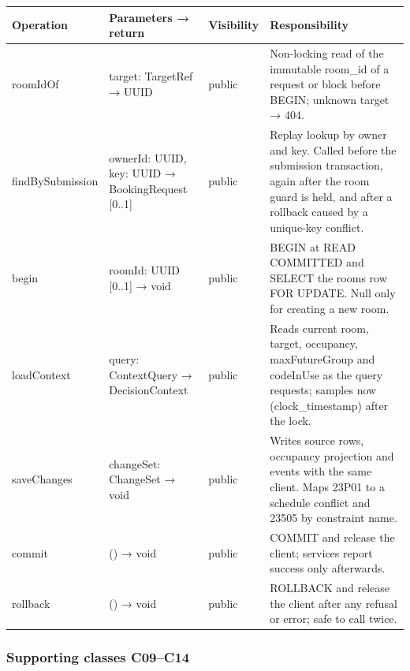 \small
\setlength{\tabcolsep}{3pt}
\renewcommand{\arraystretch}{1.12}
\begin{longtable}{|p{}|p{}|p{}|p{}|}
\hline
\textbf{Operation} & \textbf{Parameters → return} & \textbf{Visibility} & \textbf{Responsibility} \\ \hline
\endfirsthead \hline
roomIdOf & target: TargetRef → UUID & public & Non-locking read of the immutable room\_id of a request or block before BEGIN; unknown target → 404. \\ \hline
findBySubmission & ownerId: UUID, key: UUID → BookingRequest [0..1] & public & Replay lookup by owner and key. Called before the submission transaction, again after the room guard is held, and after a rollback caused by a unique-key conflict. \\ \hline
begin & roomId: UUID [0..1] → void & public & BEGIN at READ COMMITTED and SELECT the rooms row FOR UPDATE. Null only for creating a new room. \\ \hline
loadContext & query: ContextQuery → DecisionContext & public & Reads current room, target, occupancy, maxFutureGroup and codeInUse as the query requests; samples now (clock\_timestamp) after the lock. \\ \hline
saveChanges & changeSet: ChangeSet → void & public & Writes source rows, occupancy projection and events with the same client. Maps 23P01 to a schedule conflict and 23505 by constraint name. \\ \hline
commit & () → void & public & COMMIT and release the client; services report success only afterwards. \\ \hline
rollback & () → void & public & ROLLBACK and release the client after any refusal or error; safe to call twice. \\ \hline
\end{longtable}
\normalsize

\subsubsection{Supporting classes C09–C14}

